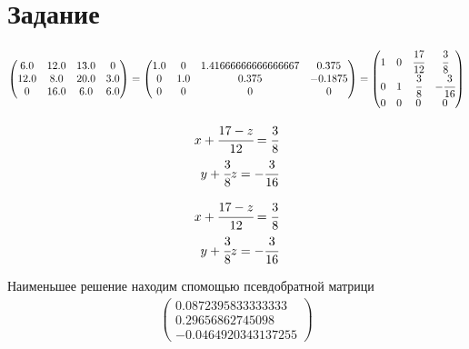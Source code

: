 \section{Задание}
\begin{gather}
    \begin{pmatrix} 
        6.0 & 12.0 & 13.0 & 0 \\ 
        12.0 & 8.0 & 20.0 & 3.0 \\ 
        0 & 16.0 & 6.0 & 6.0
    \end{pmatrix}
    =
    \begin{pmatrix} 
        1.0 & 0 & 1.41666666666666667 & 0.375 \\ 
        0 & 1.0 & 0.375 & -0.1875 \\ 
        0 & 0 & 0 & 0
    \end{pmatrix}
    = 
    \begin{pmatrix} 
        1 & 0 & \cfrac{17}{12} & \cfrac{3}{8}  \\ 
        0 & 1 & \cfrac{3}{8} & -\cfrac{3}{16}\\ 
        0 & 0 & 0 & 0
    \end{pmatrix}
\end{gather}

\begin{eqnarray}
    x + \cfrac{17-z}{12}=\cfrac{3}{8}\\
    y + \cfrac{3}{8}z=-\cfrac{3}{16}
\end{eqnarray}

\begin{eqnarray}
    x + \cfrac{17-z}{12}=\cfrac{3}{8}\\
    y + \cfrac{3}{8}z=-\cfrac{3}{16}
\end{eqnarray}

Наименьшее решение находим спомощью псевдобратной матрици
\begin{gather}
    \begin{pmatrix} 
        0.0872395833333333 \\ 
        0.29656862745098 \\ 
        -0.0464920343137255
    \end{pmatrix}
\end{gather}


